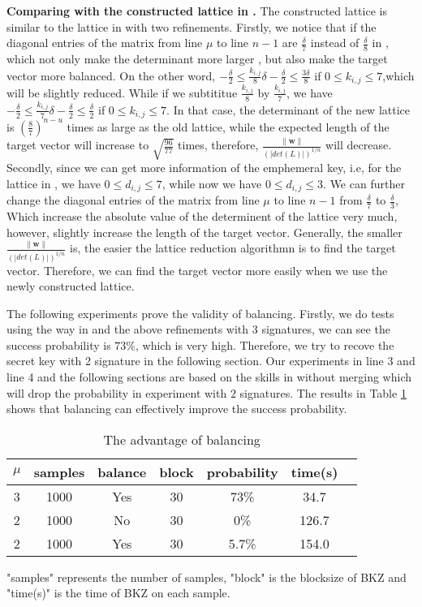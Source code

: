 \documentclass[sigconf]{acmart}
\begin{document}
 {\bf Comparing with the constructed lattice in \cite{FWC16}.}  The constructed lattice is similar to the lattice in \cite{FWC16} with two refinements. Firstly, we notice that if the diagonal entries of the matrix from line $\mu$ to line $n-1$ are  $\frac{\delta}{7}$ instead of  $\frac{\delta}{8}$ in \cite{FWC16}, which not only make the  determinant more larger , but also make the target vector more balanced. On the other word, $-\frac{\delta}{2}\leq \frac{k_{i,j}}{8}\delta-\frac{\delta}{2}\leq \frac{3\delta}{8}$ if $0\leq k_{i,j}\leq 7$,which will be slightly reduced. While if we subtititue $\frac{k_{i,j}}{8}$ by $\frac{k_{i,j}}{7}$, we have  $-\frac{\delta}{2}\leq\frac{k_{i,j}}{7}\delta-\frac{\delta}{2}\leq \frac{\delta}{2}$ if $0\leq k_{i,j}\leq 7$. In that case, the determinant of the new lattice is $(\frac{8}{7})^{n-u}$ times as large as the old lattice, while the expected length of the target vector will increase to $\sqrt{\frac{96}{77}}$ times, therefore, $\frac{\|\textbf{w}\|}{(|det(L)|)^{1/n}}$ will decrease.  Secondly, since we can get more information of the emphemeral key, i.e, for the lattice in \cite{FWC16}, we have $0\leq d_{i,j}\leq 7$, while now we have $0\leq d_{i,j}\leq 3$. We can further change the diagonal entries of the matrix from line $\mu$ to line $n-1$ from $\frac{\delta}{7}$ to  $\frac{\delta}{3}$, Which increase the absolute value of the determinent of the lattice very much, however, slightly increase the length of the target vector. Generally, the smaller $\frac{\|\textbf{w}\|}{(|det(L)|)^{1/n}}$ is, the easier the lattice reduction algorithmn is to find the target vector. Therefore, we can find the target vector more easily when we use the newly constructed lattice.

The following experiments prove the validity of balancing. Firstly, we do tests using the way in \cite{FWC16} and the above refinements with 3 signatures, we can see the success probability is $73\%$, which is very high. Therefore, we try to recove the secret key with 2 signature in the following section.  Our experiments in line 3 and line 4 and the following sections are based on the skills in \cite{FWC16} without merging which will drop the probability in experiment with $2$ signatures. The results in Table \ref{table1} shows that balancing can effectively improve the success probability.
 \begin{table}[!hbp]
\begin{tabular}{|c|c|c|c|c|c|c|}
\hline
$\mu$&samples&balance&block&probability&time(s)\\
\hline
3&1000&Yes&30&73\%&34.7\\
\hline
2&1000&No&30&0\%&126.7\\
\hline
2&1000&Yes&30&5.7\%&154.0\\
\hline

\end{tabular}
\caption{The advantage of balancing}\label{table1}
"samples" represents the number of samples, "block" is the blocksize of BKZ and "time(s)" is the time of BKZ on each sample.
\end{table}
\end{document}
